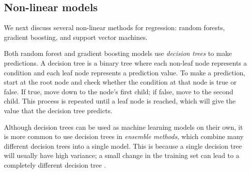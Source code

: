 \documentclass{article}
\begin{document}
	\subsection{Non-linear models}
	We next discuss several non-linear methods for regression: random forests, gradient boosting, and support vector machines.
	
	
	Both random forest and gradient boosting models use \textit{decision trees} to make predictions. A decision tree is a binary tree where each non-leaf node represents a condition and each leaf node represents a prediction value. To make a prediction, start at the root node and check whether the condition at that node is true or false. If true, move down to the node's first child; if false, move to the second child. This process is repeated until a leaf node is reached, which will give the value that the decision tree predicts.

	Although decision trees can be used as machine learning models on their own, it is more common to use decision trees in \textit{ensemble methods}, which combine many different decision trees into a single model. This is because a single decision tree will usually have high variance; a small change in the training set can lead to a completely different decision tree \cite{james2013introduction}.
	
\end{document}
